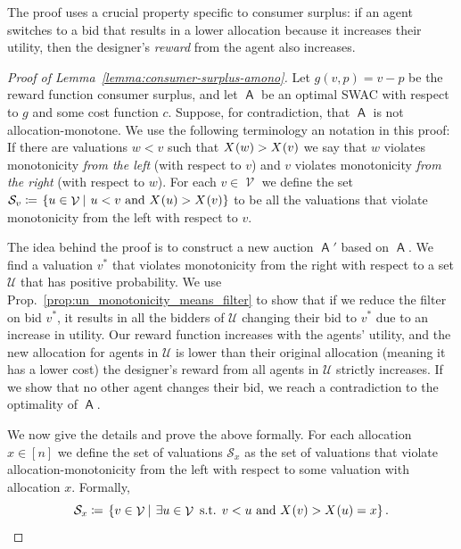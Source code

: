 \documentclass[11pt,letterpaper]{article}
\newcommand{\amono}{allocation-monotone\xspace}
\newcommand{\swac}{SWAC\xspace}
\newcommand \sett[2] { \left.\left\{{#1}\medspace\right\vert\medspace{#2}\right\}}
\newcommand{\sqrrange}[1]{[#1]}
\DeclareMathOperator{\A}{\auc{A}}
\renewcommand{\S}{\mathcal{S}}
\DeclareMathOperator{\V}{\mathcal{V}}
\newcommand{\vstar}{{v^*}}
\newcommand{\g}{g}
\theoremstyle{plain}
\newcommand{\auc}[1]{\mathsf{#1}}
\begin{document}
The proof uses a crucial property specific to consumer surplus: if an agent 
switches to a bid that results in a lower allocation
because it increases their utility, 
then the designer's \emph{reward} from the agent also increases.
\begin{proof}[Proof of Lemma~\ref{lemma:consumer-surplus-amono}]
    Let $\g(v,p)=v- p$ be the reward function consumer surplus, and
    let $\A$ be an optimal \swac with respect to $\g$ and some cost function $c$.
    Suppose, for contradiction, that $\A$ is not \amono.
    We use the following terminology an notation in this proof: If there are valuations $w<v$ such that $\x{w}>\x{v}$ we say that $w$ violates monotonicity \emph{from the left} (with respect to $v$) and $v$ violates monotonicity \emph{from the right} (with respect to $w$). For each $v\in\V$ we define the set $\S_v\coloneq\sett{u\in\V}{u<v\textnormal{ and }\x{u}>\x{v}}$  to be all the valuations that violate monotonicity from the left with respect to $v$.
    
    The idea behind the proof is to construct a new auction $\A'$ based on $\A$. We find a valuation $\vstar$ that violates monotonicity from the right with respect to a set $\mathcal{U}$ that has positive probability. We use Prop.~\ref{prop:un_monotonicity_means_filter} to show that if we reduce the filter on bid $\vstar$, it results in all the bidders of $\mathcal{U}$ changing their bid to $\vstar$ due to an increase in utility. Our reward function increases with the agents' utility, and the new allocation for agents in $\mathcal{U}$ is lower than their original allocation (meaning it has a lower cost) the designer's reward from all agents in $\mathcal{U}$ strictly increases. If we show that no other agent changes their bid, we reach a contradiction to the optimality of $\A$.
    
    We now give the details and prove the above formally. 
    For each allocation $x\in\sqrrange{n}$ we define the set of valuations $\S_x$ as the set of valuations that violate allocation-monotonicity from the left with respect to some valuation with allocation $x$. Formally, 
    $$\S_x\coloneq\sett{v\in\V}{\exists u\in\V\textnormal{ s.t. }v<u\textnormal{ and }\x{v}>\x{u}=x}.$$


\end{proof}
\end{document}
